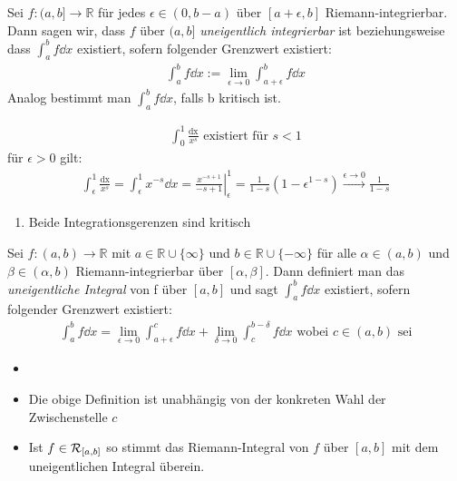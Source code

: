 \begin{Definition}{
	Sei $f: (a, b] \rightarrow \mathbb{R}$ für jedes $ \epsilon \in (0, b-a)$ 
	über $[a + \epsilon, b]$ Riemann-integrierbar. Dann sagen wir, dass $f$ 
	über $(a,b]$ \emph{uneigentlich integrierbar} ist beziehungsweise dass 
	$\int_a^b f \dd{x}$ existiert, sofern folgender Grenzwert existiert:
	\begin{align*}
		\int_a^b f \dd{x} := \lim\limits_{\epsilon \rightarrow 0}
		{\int_{a + \epsilon}^b f \dd{x}}
	\end{align*}
	Analog bestimmt man $\int_a^b f \dd{x}$, falls b kritisch ist.
}\end{Definition}

\begin{Beispiel}{\label{vl_13_bsp_2}
	\begin{align*}
		\int_0^1 \frac{\mathrm{dx}}{x^s} \text{ existiert für } s < 1
	\end{align*}
	für $\epsilon > 0$ gilt:
	\begin{align*}
		\int_{\epsilon}^1 \frac{\mathrm{dx}}{x^s} = \int_{\epsilon}^1 x^{-s} \dd{x} 
		= \left. \frac{x^{-s+1}}{-s+1} \right\vert_{\epsilon}^1 
		= \frac{1}{1-s} (1- \epsilon^{1-s}) \overset{\epsilon \rightarrow 0}
		{\longrightarrow}\frac{1}{1-s}
	\end{align*}
}\end{Beispiel}


\begin{enumerate}[resume]
	\item Beide Integrationsgerenzen sind kritisch
\end{enumerate}

\begin{Definition}{
	Sei $f:(a,b) \rightarrow \mathbb{R}$ mit $a \in \mathbb{R} \cup \{ \infty\}$ 
	und $b \in \mathbb{R} \cup \{-\infty\}$ für alle $\alpha \in (a,b)$ und 
	$\beta \in (\alpha, b)$ Riemann-integrierbar über $[\alpha, \beta]$.
	Dann definiert man das \emph{uneigentliche Integral} von f über $[a,b]$ und 
	sagt $\int_a^b f \dd{x}$ existiert, sofern folgender Grenzwert existiert:
	\begin{align*}
		\int_a^b f \dd{x} = \lim\limits_{\epsilon \rightarrow 0}{\int_{a + \epsilon}
		^c f \dd{x}} + \lim\limits_{\delta \rightarrow 0}{\int_c ^{b - \delta} f 
		\dd{x}} \text{ wobei } c \in (a,b) \text{ sei}
	\end{align*}
}\end{Definition}


\begin{Bemerkung}{
	\begin{itemize}
		\item[ ]
		\item Die obige Definition ist unabhängig von der konkreten Wahl der 
		Zwischenstelle $c$
		\item Ist $f \in \mathcal{R}_{[{a},{b}]}$ so stimmt das Riemann-Integral von $f$ über 
		$[a,b]$ mit dem uneigentlichen Integral überein.
	\end{itemize}
}\end{Bemerkung}

